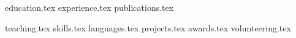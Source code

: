 \documentclass[letterpaper,11pt]{article}
\begin{document}


{education.tex}
{experience.tex}
{publications.tex}

\pagebreak

{teaching.tex}
\sidebyside
    {{skills.tex}}
    {{languages.tex}}
{projects.tex}
{awards.tex}
{volunteering.tex}
\end{document}
